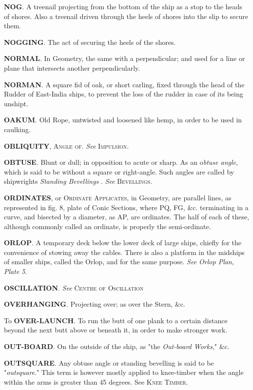 \textbf{NOG}. A treenail projecting from the bottom of the ship as a stop to the heads of shores. Also a treenail driven through the heels of shores into the slip to secure them. 

\textbf{NOGGING}. The act of securing the heels of the shores.

\textbf{NORMAL}. In Geometry, the same with a perpendicular; and used for a line or plane that intersects another perpendicularly. 

\textbf{NORMAN}. A square fid of oak, or short carling, fixed through the head of the Rudder of East-India ships, to prevent the loss of the rudder in case of its being unshipt.

\textbf{OAKUM}. Old Rope, untwisted and loosened like hemp, in order to be used in caulking. 

\textbf{OBLIQUITY}, \textsc{Angle of}. \textit{See} \textsc{Impulsion}. 

\textbf{OBTUSE}. Blunt or dull; in opposition to acute or sharp. As an o\textit{btuse angle}, which is said to be without a square or right-angle. Such angles are called by shipwrights \textit{Standing Bevellings} . \textit{See} \textsc{Bevellings}.

\textbf{ORDINATES}, or \textsc{Ordinate Applicates}, in Geometry, are parallel lines, as represented in fig. 8, plate of Conic Sections, where PQ, FG, \&c. terminating in a curve, and bisected by a diameter, as AP, are ordinates. The half of each of these, although commonly called an ordinate, is properly the semi-ordinate. 

\textbf{ORLOP}. A temporary deck below the lower deck of large ships, chiefly for the convenience of stowing away the cables. There is also a platform in the midships of smaller ships, called the Orlop, and for the same purpose. \textit{See Orlop Plan, Plate 5}. 

\textbf{OSCILLATION}. \textit{See} \textsc{Centre of Oscillation}

\textbf{OVERHANGING}. Projecting over; as over the Stern, \&c. 

To \textbf{OVER-LAUNCH}. To run the butt of one plank to a certain distance beyond the next butt above or beneath it, in order to make stronger work. 

\textbf{OUT-BOARD}. On the outside of the ship, as "the \textit{Out-board Works}," \&c.

\textbf{OUTSQUARE}. Any obtuse angle or standing bevelling is said to be "\textit{outsquare}." This term is however mostly applied to knee-timber when the angle within the arms is greater than 45 degrees. See \textsc{Knee Timber}. 


